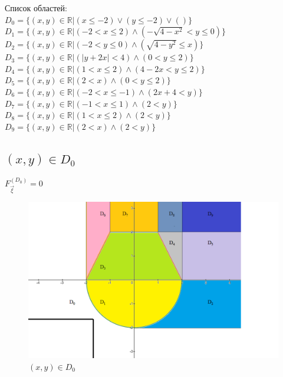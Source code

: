 \documentclass[14pt, a4paper, ukrainian]{extreport}
\begin{document}
	Список областей:\\
	$ D_0 = \{(x, y) \in \mathbb{R} | (x \le -2) \vee (y \le -2) \vee ()\}
	$\\
	$ D_1 = \{(x, y) \in \mathbb{R} | (-2 < x \le 2) \wedge (-\sqrt{4-x^2} < y \le 0)\}
	$\\
	$ D_2 = \{(x, y) \in \mathbb{R} | (-2 < y \le 0) \wedge (\sqrt{4 - y^2} \le x)\}
	$\\
	$ D_3 = \{(x, y) \in \mathbb{R} | (|y + 2x| < 4) \wedge (0 < y \le 2)\}
	$\\
	$ D_4 = \{(x, y) \in \mathbb{R} | (1 < x \le 2) \wedge (4 - 2x < y \le 2)\}
	$\\
	$ D_5 = \{(x, y) \in \mathbb{R} | (2 < x) \wedge (0 < y \le 2)\}
	$\\
	$ D_6 = \{(x, y) \in \mathbb{R} | (-2 < x \le -1) \wedge (2x + 4 < y)\}$\\
	$ D_7 = \{(x, y) \in \mathbb{R} | (-1 < x \le 1) \wedge (2 < y)\}
	$\\		
	$ D_8 = \{(x, y) \in \mathbb{R} | (1 < x \le 2) \wedge (2 < y)\}
	$\\
	$ D_9 = \{(x, y) \in \mathbb{R} | (2 < x) \wedge (2 < y)\}
	$\\
	
	\subsection{ $(x, y) \in D_0$ }
	$F_{\vec \xi}^{\left(D_0\right)} = 0$
	
	\begin{figure}[H]
		\centering
		\includegraphics[width=\textwidth]{./Image/Im_11_D_0.png}
		\caption{$(x, y) \in D_0$}
		\label{im:D_0}
	\end{figure}
	
\end{document}
